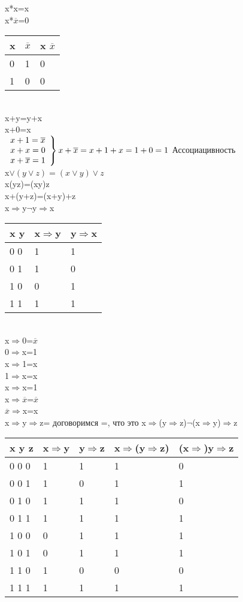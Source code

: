 \documentclass{article}
\begin{document}
x*x=x\\
x*$\overline{x}$=0\\
\begin{tabular}{l|l|l}
x&$\overline{x}$&x $\overline{x}$\\
\hline
0 & 1& 0\\
1 & 0& 0\\
\end{tabular}\\
x+y=y+x\\
x+0=x\\
$
\left.
\begin{array}{rcll}
x+1=\overline{x}\\
x+x=0\\
x+\overline{x}=1
\end{array}
\right\}{x+\overline{x}=x+1+x=1+0=1}\\
$
Ассоциацивность\\
x$\vee(y\vee z)=(x \vee y) \vee z$\\
x(yz)=(xy)z\\
x+(y+z)=(x+y)+z\\
x$\Rightarrow$y$\neg$y$\Rightarrow$x\\
\begin{tabular}{l|l|l}
x y&x$\Rightarrow$y&y$\Rightarrow$x\\
\hline
0 0& 1& 1\\
0 1& 1& 0\\
1 0& 0& 1\\
1 1& 1& 1\\
\end{tabular}\\
x$\Rightarrow$0=$\overline{x}$\\
0$\Rightarrow$x=1\\
x$\Rightarrow$1=x\\
1$\Rightarrow$x=x\\
x$\Rightarrow$x=1\\
x$\Rightarrow \overline{x}$=$\overline{x}$\\
$\overline{x} \Rightarrow$x=x\\
x$\Rightarrow$y$\Rightarrow$z= договоримся =, что это x$\Rightarrow$(y$\Rightarrow$z)$\neg$(x$\Rightarrow$y)$\Rightarrow$z\\
\begin{tabular}{l|l|l|l|l}
x y z&x$\Rightarrow$y&y$\Rightarrow$z&x$\Rightarrow$(y$\Rightarrow$z)&(x$\Rightarrow$)y$\Rightarrow$z\\
\hline
0 0 0& 1& 1&1&0\\
0 0 1& 1& 0&1&1\\
0 1 0& 1& 1&1&0\\
0 1 1& 1& 1&1&1\\
1 0 0& 0& 1&1&1\\
1 0 1& 0& 1&1&1\\
1 1 0& 1& 0&0&0\\
1 1 1& 1& 1&1&1\\
\end{tabular}\\
\end{document}
